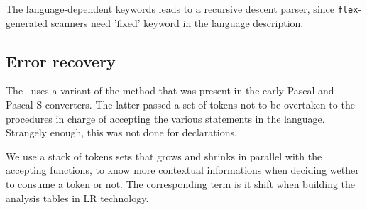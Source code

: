 The language-dependent keywords leads to a recursive descent parser, since {\tt flex}-generated scanners need 'fixed' keyword in the language description.


\subsection{Error recovery}

The \mfslLangInterp\ uses a variant of the  method that was present in the early Pascal and Pascal-S converters. The latter passed a set of tokens not to be overtaken to the procedures in charge of accepting the various statements in the language. Strangely enough, this was not done for declarations.

We use a stack of tokens sets that grows and shrinks in parallel with the accepting functions, to know more contextual informations when deciding wether to consume a token or not. The corresponding term is {it shift}
when building the analysis tables in LR technology.


